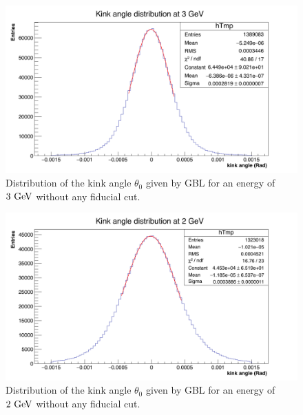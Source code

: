    \begin{figure}[!p]
     \centering
     \includegraphics[width = \textwidth]{Pictures/X0/kinkAngle3GeV.png}
     \caption{Distribution of the kink angle $\theta_{0}$ given by GBL for an energy of $3~\rm{GeV}$ without any fiducial cut.}
     \label{fig:kinkAngle3GeV}
   \end{figure} 

   \begin{figure}[!p]
     \centering
     \includegraphics[width = \textwidth]{Pictures/X0/kinkAngle2GeV.png}
     \caption{Distribution of the kink angle $\theta_{0}$ given by GBL for an energy of $2~\rm{GeV}$ without any fiducial cut.}
     \label{fig:kinkAngle2GeV}
   \end{figure} 


